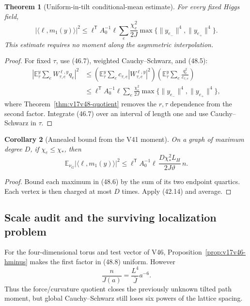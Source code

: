 \documentclass[11pt]{article}
\newtheorem{theorem}{Theorem}[section]
\newtheorem{corollary}[theorem]{Corollary}
\theoremstyle{remark}
\begin{document}
\begin{theorem}[Uniform-in-tilt conditional-mean estimate]
\label{thm:v17v48-mean}
For every fixed Higgs field,
\[
\boxed{
 |\langle\ell,m_1(y)\rangle|^2
 \leq
 \ell^{\mathsf T}A_0^{-1}\ell
 \sum_e\frac{\chi_e^2}{2J}
 \max\{\|y_{e_-}\|^4,\|y_{e_+}\|^4\}.}            \tag{48.6}
\]
This estimate requires no moment along the asymmetric interpolation.
\end{theorem}

\begin{proof}
For fixed \(\tau\), use (46.7), weighted Cauchy--Schwarz, and (48.5):
\[
\begin{aligned}
 \left|
 \mathbb E_\tau^y\sum_eW_{\tau,e}^{\ell,y}q_e
 \right|^2
 &\leq
 \left(\mathbb E_\tau^y\sum_ec_{\tau,e}|W_{\tau,e}^{\ell,y}|^2\right)
 \left(\mathbb E_\tau^y\sum_e\frac{q_e^2}{c_{\tau,e}}\right)\\
 &\leq
 \ell^{\mathsf T}A_0^{-1}\ell
 \sum_e\frac{\chi_e^2}{2J}
 \max\{\|y_{e_-}\|^4,\|y_{e_+}\|^4\},             \tag{48.7}
\end{aligned}
\]
where Theorem~\ref{thm:v17v48-quotient} removes the \(r,\tau\)
dependence from the second factor.  Integrate (46.7) over an interval
of length one and use Cauchy--Schwarz in \(\tau\).
\end{proof}

\begin{corollary}[Annealed bound from the V41 moment]
\label{cor:v17v48-annealed}
On a graph of maximum degree \(D\), if \(\chi_e\leq\chi_*\), then
\[
\boxed{
 \mathbb E_{\nu_G}
 |\langle\ell,m_1(y)\rangle|^2
 \leq
 \ell^{\mathsf T}A_0^{-1}\ell\,
 \frac{D\chi_*^2L_H}{2J\vartheta}\,n.}            \tag{48.8}
\]
\end{corollary}

\begin{proof}
Bound each maximum in (48.6) by the sum of its two endpoint quartics.
Each vertex is then charged at most \(D\) times.  Apply (42.14) and
average.
\end{proof}

\subsection{Scale audit and the surviving localization problem}

For the four-dimensional torus and test vector of V46,
Proposition~\ref{prop:v17v46-hminus} makes the first factor in (48.8)
uniform.  However
\[
 \frac{n}{J(a)}
 =
 \frac{L^4}{\bar J}a^{-6}.                         \tag{48.9}
\]
Thus the force/curvature quotient closes the previously unknown
tilted path moment, but global Cauchy--Schwarz still loses six powers
of the lattice spacing.
\end{document}

